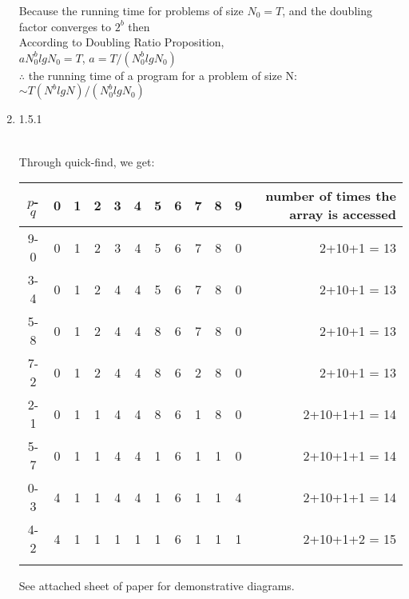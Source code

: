 \documentclass[11pt]{article}
\begin{document}
\begin{enumerate}
\begin{solution}
Because the running time for problems of size $N_0= T$, and the doubling factor converges to $2^b$ then\\
According to Doubling Ratio Proposition, \\
$aN_0 ^b lgN_0 = T$, $a = T/ (N_0 ^b lg N_0)$ \\
$\therefore$ the running time of a program for a problem of size N: $\sim T (N^b lgN)/ (N_0 ^b lg N_0)$

\end{solution}

\item 1.5.1
\begin{solution}\\
Through quick-find, we get: \\
\begin{tabular}{c|cccccccccc|r}
$p$-$q$& 0&1 &2 &3 &4 &5 &6 &7 & 8 & 9 & number of times the array is accessed\\
\hline
9-0 & 0&1 &2 &3 &4 &5 &6 &7 & 8 & 0 & 2+10+1 = 13\\
3-4 & 0&1 &2 &4 &4 &5 &6 &7 & 8 & 0 & 2+10+1 = 13\\
5-8 & 0&1 &2 &4 &4 &8 &6 &7 & 8 & 0 & 2+10+1 = 13\\
7-2 & 0&1 &2 &4 &4 &8 &6 &2 & 8 & 0 & 2+10+1 = 13\\
2-1 & 0&1 &1 &4 &4 &8 &6 &1 & 8 & 0 & 2+10+1+1 = 14\\
5-7 & 0&1 &1 &4 &4 &1 &6 &1 & 1 & 0 & 2+10+1+1 = 14\\
0- 3& 4&1 &1 &4 &4 &1 &6 &1 & 1 & 4 & 2+10+1+1 = 14\\
4- 2& 4&1 &1 &1 &1 &1 &6 &1 & 1 & 1 & 2+10+1+2 = 15\\
\\
\end{tabular}
See attached sheet of paper for demonstrative diagrams.
\end{solution}


\end{enumerate}
\end{document}
